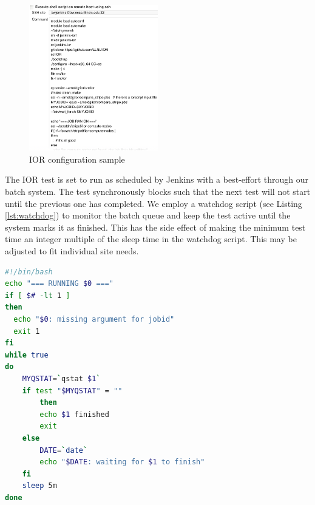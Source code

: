 \documentclass[AMA]{WileyNJD-v1}
\begin{document}
\begin{figure}[H]
\centering
\includegraphics[width=0.5\textwidth]{IOR-configuration-sample}
\caption{ IOR configuration sample }
\label{fig:IOR-configuration-sample}
\end{figure}
The IOR test is set to run as scheduled by Jenkins with a best-effort through our batch system.
The test synchronously blocks such that the next test will not start until the previous one has completed.
We employ a watchdog script (see Listing \ref{lst:watchdog}) to monitor the batch queue and keep the test active until the system marks it as finished.
This has the side effect of making the minimum test time an integer multiple of the sleep time in the watchdog script.
This may be adjusted to fit individual site needs.
\begin{lstlisting}[frame=tb,captionpos=t,language=bash,caption={pbs/torque watchdog script}, label=lst:watchdog]
#!/bin/bash
echo "=== RUNNING $0 ==="
if [ $# -lt 1 ]
then
  echo "$0: missing argument for jobid"
  exit 1
fi
while true
do
	MYQSTAT=`qstat $1`
	if test "$MYQSTAT" = ""
        then
		echo $1 finished
		exit
	else
		DATE=`date`
		echo "$DATE: waiting for $1 to finish"
	fi
	sleep 5m
done
\end{lstlisting}
\end{document}
